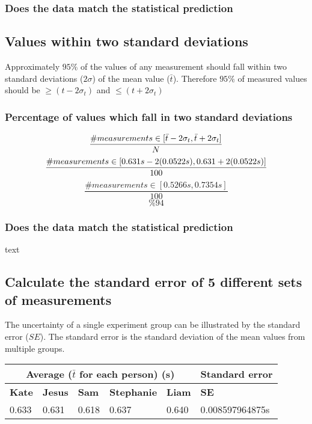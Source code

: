 \documentclass[11pt, letterpaper, includehead]{article}
\begin{document}
\subsubsection{Does the data match the statistical prediction} %

\subsection{Values within two standard deviations} %
Approximately $95\%$ of the values of any measurement should fall within two
standard deviations ($2 \sigma$) of the mean value ($\bar{t}$). Therefore $95\%$ of measured
values should be $\geq (t - 2 \sigma_t)$ and $\leq (t + 2 \sigma_t)$

\subsubsection{Percentage of values which fall in two standard deviations} %
$$\frac{\# measurements \in [\bar{t} - 2\sigma_t, \bar{t} + 2\sigma_t]}{N} \\$$
$$\frac{\# measurements \in [0.631s - 2(0.0522s), 0.631 + 2(0.0522s)]}{100} \\$$
$$\frac{\# measurements \in [0.5266s, 0.7354s]}{100}$$
$$\boxed{\%94}$$ %

\subsubsection{Does the data match the statistical prediction} %
text

\subsection{Calculate the standard error of 5 different sets of measurements} %

The uncertainty of a single experiment group can be illustrated by the standard
error ($SE$). The standard error is the standard deviation of the mean values
from multiple groups.
\begin{center}
  \begin{tabular}{|   m{2cm}  |  m{2cm}  |  m{2cm}  |  m{2cm}  |  m{2cm}  |  m{3cm} | }
    \hline
    \multicolumn{5}{|c|}{\textbf{Average ($\bar{t}$ for each person) (s)}} & \multicolumn{1}{l|}{\textbf{Standard error}}\\
    \hline
    \textbf{Kate} & \textbf{Jesus} & \textbf{Sam} & \textbf{Stephanie} & \textbf{Liam} & \textbf{SE}  \\
    \hline
    0.633         & 0.631          & 0.618        & 0.637              & 0.640 & 0.008597964875s \\  %
    \hline
  \end{tabular}
\end{center}
\end{document}
